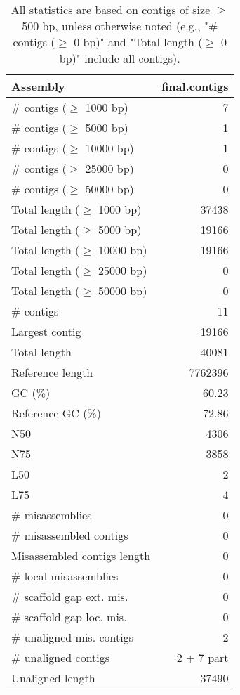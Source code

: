 \documentclass[12pt,a4paper]{article}
\begin{document}
\begin{table}[ht]
\begin{center}
\caption{All statistics are based on contigs of size $\geq$ 500 bp, unless otherwise noted (e.g., "\# contigs ($\geq$ 0 bp)" and "Total length ($\geq$ 0 bp)" include all contigs).}
\begin{tabular}{|l*{1}{|r}|}
\hline
Assembly & final.contigs \\ \hline
\# contigs ($\geq$ 1000 bp) & 7 \\ \hline
\# contigs ($\geq$ 5000 bp) & 1 \\ \hline
\# contigs ($\geq$ 10000 bp) & 1 \\ \hline
\# contigs ($\geq$ 25000 bp) & 0 \\ \hline
\# contigs ($\geq$ 50000 bp) & 0 \\ \hline
Total length ($\geq$ 1000 bp) & 37438 \\ \hline
Total length ($\geq$ 5000 bp) & 19166 \\ \hline
Total length ($\geq$ 10000 bp) & 19166 \\ \hline
Total length ($\geq$ 25000 bp) & 0 \\ \hline
Total length ($\geq$ 50000 bp) & 0 \\ \hline
\# contigs & 11 \\ \hline
Largest contig & 19166 \\ \hline
Total length & 40081 \\ \hline
Reference length & 7762396 \\ \hline
GC (\%) & 60.23 \\ \hline
Reference GC (\%) & 72.86 \\ \hline
N50 & 4306 \\ \hline
N75 & 3858 \\ \hline
L50 & 2 \\ \hline
L75 & 4 \\ \hline
\# misassemblies & 0 \\ \hline
\# misassembled contigs & 0 \\ \hline
Misassembled contigs length & 0 \\ \hline
\# local misassemblies & 0 \\ \hline
\# scaffold gap ext. mis. & 0 \\ \hline
\# scaffold gap loc. mis. & 0 \\ \hline
\# unaligned mis. contigs & 2 \\ \hline
\# unaligned contigs & 2 + 7 part \\ \hline
Unaligned length & 37490 \\ \hline

\end{tabular}
\end{center}
\end{table}
\end{document}
